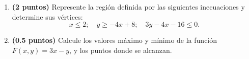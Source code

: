 
\begin{enumerate}[label=\alph*)]
\item \textbf{(2 puntos)} Represente la región definida por las siguientes inecuaciones y determine sus vértices:
\[
x\leq2;\quad y\geq-4x+8;\quad3y-4x-16\leq0.
\]
\item \textbf{(0.5 puntos)} Calcule los valores máximo y mínimo de la función $F(x,y)=3x-y$, y los puntos donde se alcanzan.
\end{enumerate}
